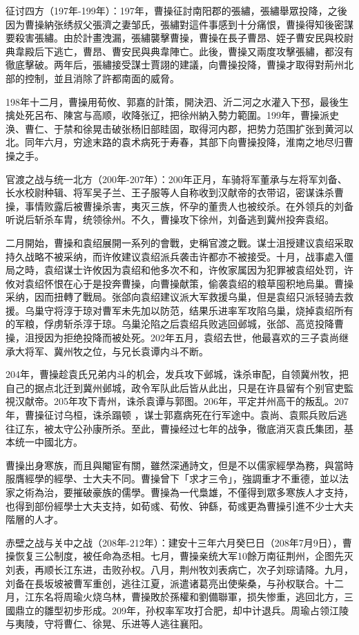 征讨四方（197年-199年）：197年，曹操征討南阳郡的張繡，張繡舉眾投降，之後因为曹操納张绣叔父張濟之妻邹氏，張繡對這件事感到十分痛恨，曹操得知後密謀要殺害張繡。由於計畫洩漏，張繡襲擊曹操，曹操在長子曹昂、姪子曹安民與校尉典韋殿后下逃亡，曹昂、曹安民與典韋陣亡。此後，曹操又兩度攻擊張繡，都沒有徹底擊破。两年后，張繡接受謀士賈詡的建議，向曹操投降，曹操才取得對荊州北部的控制，並且消除了許都南面的威脅。

198年十二月，曹操用荀攸、郭嘉的計策，開決泗、沂二河之水灌入下邳，最後生擒处死呂布、陳宮与高顺，收降张辽，把徐州納入勢力範圍。199年，曹操派史涣、曹仁、于禁和徐晃击破张杨旧部眭固，取得河内郡，把势力范围扩张到黄河以北。同年六月，穷途末路的袁术病死于寿春，其部下向曹操投降，淮南之地尽归曹操之手。

官渡之战与统一北方（200年-207年）：200年正月，车骑将军董承与左将军刘备、长水校尉种辑、将军吴子兰、王子服等人自称收到汉献帝的衣带诏，密谋诛杀曹操，事情败露后被曹操杀害，夷灭三族，怀孕的董贵人也被绞杀。在外领兵的刘备听说后斩杀车胄，统领徐州。不久，曹操攻下徐州，刘备逃到冀州投奔袁绍。

二月開始，曹操和袁绍展開一系列的會戰，史稱官渡之戰。谋士沮授建议袁绍采取持久战略不被采纳，而许攸建议袁绍派兵袭击许都亦不被接受。十月，战事處入僵局之時，袁绍谋士许攸因为袁绍和他多次不和，许攸家属因为犯罪被袁绍处罚，许攸对袁绍怀恨在心于是投奔曹操，向曹操献策，偷袭袁绍的粮草囤积地烏巢。曹操采纳，因而扭轉了戰局。张郃向袁绍建议派大军救援乌巢，但是袁绍只派轻骑去救援。乌巢守将淳于琼对曹军未先加以防范，结果乐进率军攻陷乌巢，烧掉袁绍所有的军粮，俘虏斩杀淳于琼。乌巢沦陷之后袁绍兵败逃回邺城，张郃、高览投降曹操，沮授因为拒绝投降而被处死。202年五月，袁绍去世，他最喜欢的三子袁尚继承大将军、冀州牧之位，与兄长袁谭内斗不断。

204年，曹操趁袁氏兄弟内斗的机会，发兵攻下邺城，诛杀审配，自领冀州牧，把自己的据点北迁到冀州邺城，政令军队此后皆从此出，只是在许县留有个别官吏監視汉献帝。205年攻下青州，诛杀袁谭与郭图。206年，平定并州高干的叛乱。207年，曹操征讨乌桓，诛杀蹋顿 ，谋士郭嘉病死在行军途中。袁尚、袁熙兵败后逃往辽东，被太守公孙康所杀。至此，曹操经过七年的战争，徹底消灭袁氏集团，基本统一中國北方。

曹操出身寒族，而且與閹宦有關，雖然深通詩文，但是不以儒家經學為務，與當時服膺經學的經學、士大夫不同。曹操曾下「求才三令」，強調重才不重德，並以法家之術為治，要摧破豪族的儒學。曹操為一代梟雄，不僅得到眾多寒族人才支持，也得到部份經學士大夫支持，如荀彧、荀攸、钟繇，荀彧更為曹操引進不少士大夫階層的人才。

赤壁之战与关中之战（208年-212年）：建安十三年六月癸巳日（208年7月9日），曹操恢复三公制度，被任命為丞相。七月，曹操亲统大军10餘万南征荆州，企图先灭刘表，再顺长江东进，击败孙权。八月，荆州牧刘表病亡，次子刘琮请降。九月，刘备在長坂坡被曹军重创，逃往江夏，派遣诸葛亮出使柴桑，与孙权联合。十二月，江东名将周瑜火烧乌林，曹操敗於孫權和劉備聯軍，损失惨重，逃回北方，三國鼎立的雛型初步形成。209年，孙权率军攻打合肥，却中计退兵。周瑜占领江陵与夷陵，守将曹仁、徐晃、乐进等人逃往襄阳。

